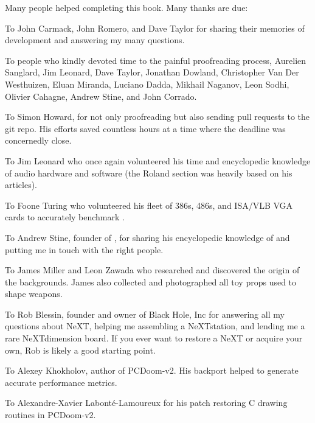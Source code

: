 Many people helped completing this book. Many thanks are due:\\
\par
To John Carmack, John Romero, and Dave Taylor for sharing their memories of \doom{} development and answering my many questions.\\
\par
To people who kindly devoted time to the painful proofreading process, Aurelien Sanglard, Jim Leonard, Dave Taylor, Jonathan Dowland, Christopher Van Der Westhuizen, Eluan Miranda, Luciano Dadda, Mikhail Naganov, Leon Sodhi, Olivier Cahagne, Andrew Stine, and John Corrado.\\
\par
To Simon Howard, for not only proofreading but also sending pull requests to the git repo. His efforts saved countless hours at a time where the deadline was
concernedly close.\\
\par
To Jim Leonard who once again volunteered his time and encyclopedic knowledge of audio hardware and software (the Roland section was heavily based on his articles).\\
\par
To Foone Turing who volunteered his fleet of 386s, 486s, and ISA/VLB VGA cards to accurately benchmark \doom{}.\\
\par
To Andrew Stine, founder of , for sharing his encyclopedic knowledge of \doom{} and putting me in touch with the right people.\\
\par
To James Miller and Leon Zawada who researched and discovered the origin of the backgrounds. James also collected and photographed all toy props used to shape \doom{} weapons.\\
\par
To Rob Blessin, founder and owner of Black Hole, Inc for answering all my questions about NeXT, helping me assembling a NeXTstation, and lending me a rare NeXTdimension board. If you ever want to restore a NeXT or acquire your own, Rob is likely a good starting point.\\
\par
To Alexey Khokholov, author of PCDoom-v2. His backport helped to generate accurate performance metrics.\\
\par
To Alexandre-Xavier Labont\'e-Lamoureux for his patch restoring C drawing routines in PCDoom-v2.\\
